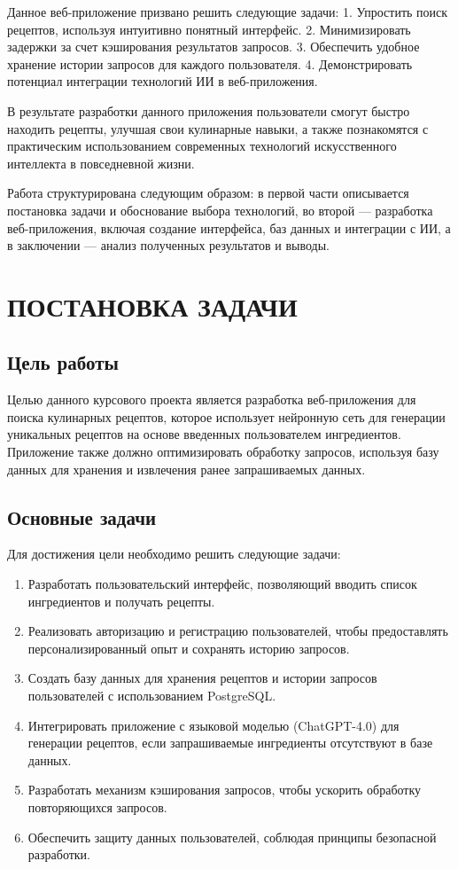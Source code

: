 {{        Данное веб-приложение призвано решить следующие задачи:
        1. Упростить поиск рецептов, используя интуитивно понятный интерфейс.
        2. Минимизировать задержки за счет кэширования результатов запросов.
        3. Обеспечить удобное хранение истории запросов для каждого пользователя.
        4. Демонстрировать потенциал интеграции технологий ИИ в веб-приложения.
        
        В результате разработки данного приложения пользователи смогут быстро находить рецепты, улучшая свои кулинарные навыки, а также познакомятся с практическим использованием современных технологий искусственного интеллекта в повседневной жизни. 
        
        Работа структурирована следующим образом: в первой части описывается постановка задачи и обоснование выбора технологий, во второй — разработка веб-приложения, включая создание интерфейса, баз данных и интеграции с ИИ, а в заключении — анализ полученных результатов и выводы.
    }
    \newpage

\newpage

\section{\MakeUppercase{Постановка задачи}}


\subsection*{Цель работы}
Целью данного курсового проекта является разработка веб-приложения для поиска кулинарных рецептов, которое использует нейронную сеть для генерации уникальных рецептов на основе введенных пользователем ингредиентов. Приложение также должно оптимизировать обработку запросов, используя базу данных для хранения и извлечения ранее запрашиваемых данных.

\subsection*{Основные задачи}
Для достижения цели необходимо решить следующие задачи:
\begin{enumerate}
    \item Разработать пользовательский интерфейс, позволяющий вводить список ингредиентов и получать рецепты.
    \item Реализовать авторизацию и регистрацию пользователей, чтобы предоставлять персонализированный опыт и сохранять историю запросов.
    \item Создать базу данных для хранения рецептов и истории запросов пользователей с использованием PostgreSQL.
    \item Интегрировать приложение с языковой моделью (ChatGPT-4.0) для генерации рецептов, если запрашиваемые ингредиенты отсутствуют в базе данных.
    \item Разработать механизм кэширования запросов, чтобы ускорить обработку повторяющихся запросов.
    \item Обеспечить защиту данных пользователей, соблюдая принципы безопасной разработки.
\end{enumerate}

}
